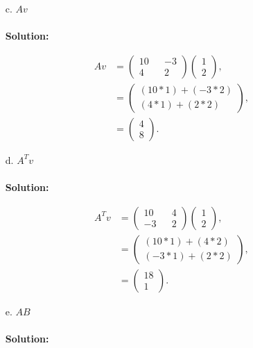 \documentclass[12pt]{article}
\makeatletter
\theoremstyle{homework}
\newenvironment{exercise}[1]
{\def\@currentlabel{#1}\exercisecore}
{\endexercisecore}
\makeatother
\begin{document}
\begin{exercise}{2}
\begin{enumerate}
  \item[c.] $Av$\\\\
  \textbf{Solution:}

  \begin{align*}
    Av &=
    \begin{pmatrix}
      10 && -3 \\
      4 && 2 
    \end{pmatrix}
    \begin{pmatrix}
      1 \\
      2
    \end{pmatrix},\\
    &=
    \begin{pmatrix}
      (10*1) + (-3*2) \\
      (4*1) + (2*2)
    \end{pmatrix},
    \\
    &= \begin{pmatrix}
      4 \\
      8
    \end{pmatrix}.
  \end{align*}






  \item[d.] $A^{T}v$\\\\
  \textbf{Solution:}

  \begin{align*}
    A^{T}v &=
    \begin{pmatrix}
      10 && 4 \\
      -3 && 2 
    \end{pmatrix}
    \begin{pmatrix}
      1 \\
      2
    \end{pmatrix},\\
    &=
    \begin{pmatrix}
      (10*1) + (4*2) \\
      (-3*1) + (2*2)
    \end{pmatrix},
    \\
    &= \begin{pmatrix}
      18 \\
      1
    \end{pmatrix}.
  \end{align*}




  \item[e.] $AB$\\\\
  \textbf{Solution:}


\end{enumerate}
\end{exercise}
\end{document}
